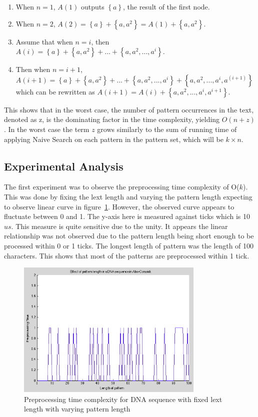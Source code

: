 \documentclass[paper=a4, fontsize=11pt]{scrartcl} %
\numberwithin{equation}{section} %
\numberwithin{figure}{section} %
\numberwithin{table}{section} %
\begin{document}
\begin{enumerate}
  \item When $n = 1$, $A(1)$ outputs $\left\{a\right\}$, the result of the first node.
  \item When $n = 2$, $A(2) = \left\{a\right\} + \left\{a, a^2\right\} = A(1) + \left\{a, a^2\right\}$.
  \item Assume that when $n = i$, then $A(i) =  \left\{a\right\} + \left\{a, a^2\right\} + \dots + \left\{a, a^2, ..., a^i\right\}$.
  \item Then when $n = i+1$, $A(i+1) = \left\{a\right\} + \left\{a, a^2\right\} + \dots + \left\{a, a^2, ..., a^i\right\} + \left\{a, a^2, ..., a^i, a^(i+1)\right\}$ which can be rewritten as  $A(i+1) = A(i) + \left\{a, a^2, ..., a^i, a^{i+1}\right\}$.
\end{enumerate}
This shows that in the worst case, the number of pattern occurrences in the text, denoted as z, is the dominating factor in the time complexity, yielding $O(n+z)$. In the worst case the term $z$ grows similarly to the sum of running time of applying Naive Search on each pattern in the pattern set, which will be $k\times n$.

\subsection{Experimental Analysis}
The first experiment was to observe the preprocessing time complexity of O($k$). This was done by fixing the lext length and varying the pattern length expecting to observe linear curve in figure~\ref{fig:pre-fixed-text}. However, the observed curve appears to fluctuate between 0 and 1. The y-axis here is measured against ticks which is 10$us$. This measure is quite sensitive due to the unity. It appears the linear relationship was not observed due to the pattern length being short enough to be processed within 0 or 1 ticks. The longest length of pattern was the length of 100 characters. This shows that most of the patterns are preprocessed within 1 tick.

\begin{figure}[h!]
\centering
\includegraphics[width=0.8\textwidth]{figures/pre-DNA-fixed-text.png}
\caption{Preprocessing time complexity for DNA sequence with fixed lext length with varying pattern length}
\label{fig:pre-fixed-text}
\end{figure}
\end{document}
